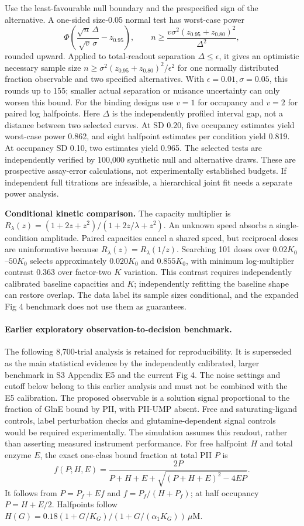 \documentclass[11pt]{article}
\begin{document}
Use the least-favourable null boundary and the prespecified sign of the alternative. A one-sided size-0.05 normal test has worst-case power
\[
 \Phi\!\left(\frac{\sqrt n\,\Delta}{\sqrt v\,\sigma}-z_{0.95}\right),
 \qquad n\geq\frac{v\sigma^2(z_{0.95}+z_{0.80})^2}{\Delta^2},
\]
rounded upward. Applied to total-readout separation $\Delta\leq\epsilon$, it gives an optimistic necessary sample size $n\geq\sigma^2(z_{0.95}+z_{0.80})^2/\epsilon^2$ for one normally distributed fraction observable and two specified alternatives. With $\epsilon=0.01,\sigma=0.05$, this rounds up to 155; smaller actual separation or nuisance uncertainty can only worsen this bound. For the binding designs use $v=1$ for occupancy and $v=2$ for paired log halfpoints. Here $\Delta$ is the independently profiled interval gap, not a distance between two selected curves. At SD 0.20, five occupancy estimates yield worst-case power 0.862, and eight halfpoint estimates per condition yield 0.819. At occupancy SD 0.10, two estimates yield 0.965. The selected tests are independently verified by 100,000 synthetic null and alternative draws. These are prospective assay-error calculations, not experimentally established budgets. If independent full titrations are infeasible, a hierarchical joint fit needs a separate power analysis.

\textbf{Conditional kinetic comparison.} The capacity multiplier is $R_\lambda(z)=(1+2z+z^2)/(1+2z/\lambda+z^2)$. An unknown speed absorbs a single-condition amplitude. Paired capacities cancel a shared speed, but reciprocal doses are uninformative because $R_\lambda(z)=R_\lambda(1/z)$. Searching 101 doses over $0.02K_0$--$50K_0$ selects approximately $0.020K_0$ and $0.855K_0$, with minimum log-multiplier contrast 0.363 over factor-two $K$ variation. This contrast requires independently calibrated baseline capacities and $K$; independently refitting the baseline shape can restore overlap. The data label its sample sizes conditional, and the expanded Fig 4 benchmark does not use them as guarantees.



\paragraph{Earlier exploratory observation-to-decision benchmark.}
The following 8,700-trial analysis is retained for reproducibility. It is superseded as the main statistical evidence by the independently calibrated, larger benchmark in S3 Appendix E5 and the current Fig 4. The noise settings and cutoff below belong to this earlier analysis and must not be combined with the E5 calibration.
The proposed observable is a solution signal proportional to the fraction of GlnE bound by PII, with PII-UMP absent. Free and saturating-ligand controls, label perturbation checks and glutamine-dependent signal controls would be required experimentally. The simulation assumes this readout, rather than asserting measured instrument performance. For free halfpoint $H$ and total enzyme $E$, the exact one-class bound fraction at total PII $P$ is
\[
 f(P;H,E)=\frac{2P}{P+H+E+\sqrt{(P+H+E)^2-4EP}}.
\]
It follows from $P=P_f+Ef$ and $f=P_f/(H+P_f)$; at half occupancy $P=H+E/2$. Halfpoints follow $H(G)=0.18(1+G/K_G)/(1+G/(\alpha_1K_G))\,\mu$M.
\end{document}
